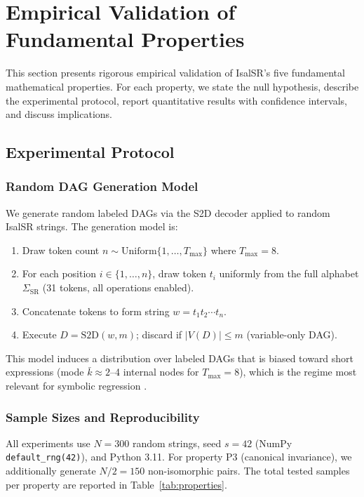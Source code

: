 \section{Empirical Validation of Fundamental Properties}
\label{sec:results}

This section presents rigorous empirical validation of IsalSR's five fundamental
mathematical properties. For each property, we state the null hypothesis,
describe the experimental protocol, report quantitative results with
confidence intervals, and discuss implications.

\subsection{Experimental Protocol}

\subsubsection{Random DAG Generation Model}
We generate random labeled DAGs via the S2D decoder applied to random IsalSR
strings. The generation model is:
\begin{enumerate}[nosep]
  \item Draw token count $n \sim \text{Uniform}\{1, \ldots, T_{\max}\}$ where $T_{\max} = 8$.
  \item For each position $i \in \{1, \ldots, n\}$, draw token $t_i$ uniformly
    from the full alphabet $\Sigma_{\mathrm{SR}}$ (31 tokens, all operations enabled).
  \item Concatenate tokens to form string $w = t_1 t_2 \cdots t_n$.
  \item Execute $D = \text{S2D}(w, m)$; discard if $|V(D)| \leq m$ (variable-only DAG).
\end{enumerate}
This model induces a distribution over labeled DAGs that is biased toward
short expressions (mode $\bar{k} \approx 2$--4 internal nodes for $T_{\max} = 8$),
which is the regime most relevant for symbolic regression \cite{liu2025}.

\subsubsection{Sample Sizes and Reproducibility}
All experiments use $N = 300$ random strings, seed $s = 42$ (NumPy
\texttt{default\_rng(42)}), and Python 3.11. For property P3 (canonical
invariance), we additionally generate $N/2 = 150$ non-isomorphic pairs.
The total tested samples per property are reported in Table~\ref{tab:properties}.

